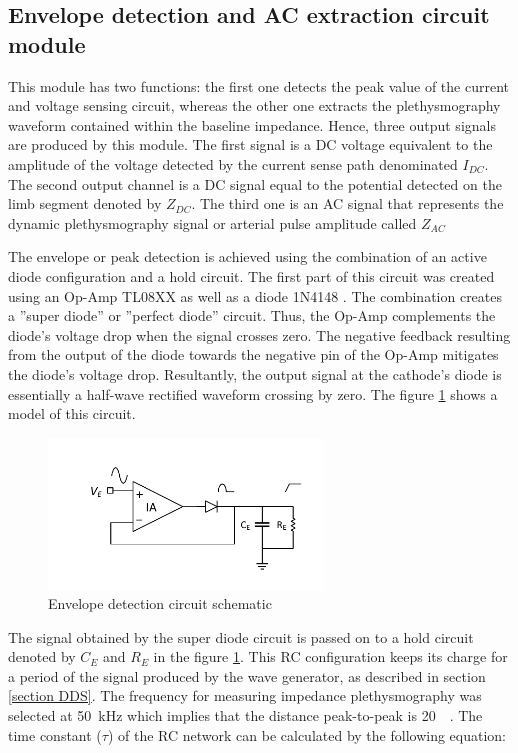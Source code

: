 \subsection{Envelope detection and AC extraction circuit module}
\label{section material envelope}
This module has two functions: the first one detects the peak value of the current and voltage sensing circuit, whereas the other one extracts the plethysmography waveform contained within the baseline impedance. Hence, three output signals are produced by this module. The first signal is a DC voltage equivalent to the amplitude of the voltage detected by the current sense path denominated $I_{DC}$. The second output channel is a DC signal equal to the potential detected on the limb segment denoted by $Z_{DC}$. The third one is an AC signal that represents the dynamic plethysmography signal or arterial pulse amplitude called $Z_{AC}$

The envelope or peak detection is achieved using the combination of an active diode configuration and a hold circuit. The first part of this circuit was created using an Op-Amp TL08XX \cite{ti:TL08xx} as well as a diode 1N4148 \cite{vishay:1N4148}. The combination creates a ''super diode'' or ''perfect diode'' circuit. Thus, the Op-Amp complements the diode's voltage drop when the signal crosses zero. The negative feedback resulting from the output of the diode towards the negative pin of the Op-Amp mitigates the diode's voltage drop. Resultantly, the output signal at the cathode's diode is essentially a half-wave rectified waveform crossing by zero. The figure \ref{fig:envelope} shows a model of this circuit. 

\begin{figure}[!htpb]
	\centering
	\includegraphics[width=7.3cm,keepaspectratio]{figure5}
	\caption{Envelope detection circuit schematic}
	\label{fig:envelope}
\end{figure}

The signal obtained by the super diode circuit is passed on to a hold circuit denoted by $C_E$ and $R_E$ in the figure \ref{fig:envelope}. This RC configuration keeps its charge for a period of the signal produced by the wave generator, as described in section \ref{section DDS}. The frequency for measuring impedance plethysmography was selected at \SI{50}{\kHz} which implies that the distance peak-to-peak is \SI{20}{\micro\sec}. The time constant ($\tau$) of the RC network can be calculated by the following equation:

